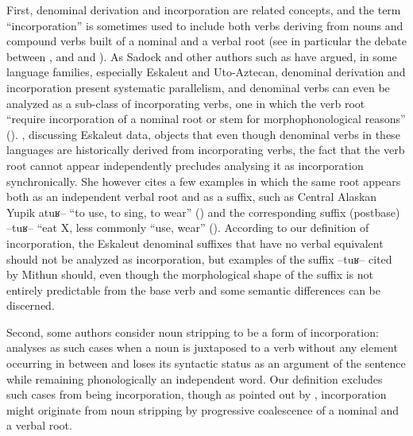 \documentclass[oldfontcommands,oneside,a4paper,11pt]{article}
\newcommand{\ipa}[1]{{\phon #1}} %
\begin{document}
First, denominal derivation and incorporation are related concepts, and the term ``incorporation'' is sometimes used to include both verbs deriving from nouns and compound verbs built of a nominal and a verbal root (see in particular the debate between \citealt{mithun84incorp}, \citealt{mithun86incorp}  and  \citealt{sadock80incorp} and  \citealt{sadock86incorp}).  As Sadock and other authors such as \citet{haugen08incorp} have argued, in some language families, especially Eskaleut and Uto-Aztecan, denominal derivation and incorporation present systematic parallelism, and denominal verbs can even be analyzed as a sub-class of incorporating verbs, one in which the verb root  ``require incorporation of a nominal root or stem for morphophonological reasons'' (\citealt[120]{haugen08incorp}). \citet[13]{mithun09poly}, discussing Eskaleut data, objects that even though denominal verbs in these languages are historically derived from incorporating verbs, the fact that the verb root cannot appear independently precludes analysing it as incorporation synchronically. She however cites a few examples in which the same root appears both as an independent verbal root and as a suffix, such as Central Alaskan Yupik \ipa{atuʁ}-- ``to use, to sing, to wear'' (\citealt[57]{fortescue10dico}) and the corresponding suffix (postbase) --\ipa{tuʁ}-- ``eat X, less commonly ``use, wear''  (\citealt[473]{fortescue10dico}). According to our definition of incorporation, the Eskaleut denominal suffixes that have no verbal equivalent should not be analyzed as incorporation, but  examples of the suffix  --\ipa{tuʁ}--   cited by Mithun should, even though the morphological shape of the suffix is not entirely predictable from the base verb and some semantic differences can be discerned.

Second, some authors consider noun stripping to be a form of incorporation: \citet[849-854]{mithun84incorp}  analyses as such cases when a noun is juxtaposed to a verb without any element occurring in between and loses its syntactic status as an argument of the sentence while remaining phonologically an independent word. Our definition excludes such cases from being incorporation, though as pointed out by \citet[872]{mithun84incorp}, incorporation might originate from noun stripping by progressive coalescence of a nominal and a verbal root.
\end{document}
